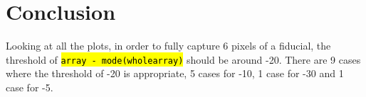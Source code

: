 \documentclass[10pt]{scrartcl}
\begin{document}


\clearpage

\section{Conclusion} %
\label{sec:conclusion}
    
    Looking at all the plots, in order to fully capture 6 pixels of a fiducial, the threshold of \hl{\texttt{array - mode(wholearray)}} should be around -20. There are 9 cases where the threshold of -20 is appropriate, 5 cases for -10, 1 case for -30 and 1 case for -5.


\end{document}
